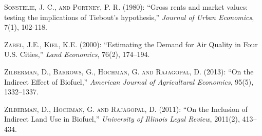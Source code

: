 \documentclass[ecta,nameyear,draft]{econsocart}
\theoremstyle{plain}
\theoremstyle{remark}
\begin{document}
\begin{thebibliography}{}
\textsc{Sonstelie, J. C., and Portney, P. R.} (1980):
``Gross rents and market values: testing the implications of Tiebout's hypothesis,''
\textit{Journal of Urban Economics}, 7(1), 102-118.
\endbibitem

\textsc{Zabel, J.E., Kiel, K.E.} (2000):
``Estimating the Demand for Air Quality in Four U.S. Cities,''
\textit{Land Economics}, 76(2), 174--194.
\endbibitem

\textsc{Zilberman, D., Barrows, G., Hochman, G. and Rajagopal, D.} (2013):
``On the Indirect Effect of Biofuel,''
\textit{American Journal of Agricultural Economics}, 95(5), 1332--1337.
\endbibitem

\textsc{Zilberman, D., Hochman, G. and Rajagopal, D.} (2011):
``On the Inclusion of Indirect Land Use in Biofuel,''
\textit{University of Illinois Legal Review}, 2011(2), 413--434.
\endbibitem

%
%
%
%
%
\end{thebibliography}
\end{document}

